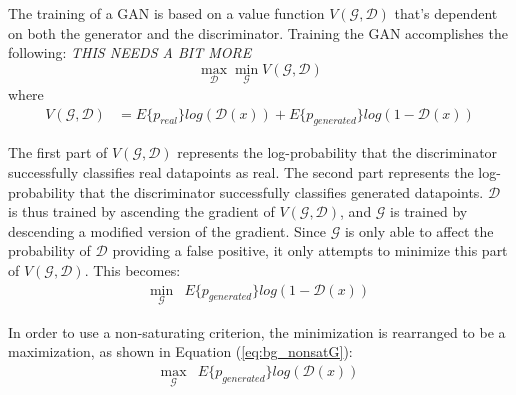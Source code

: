 	\par The training of a GAN is based on a value function $V(\mathcal{G},\mathcal{D})$ that's dependent on both the generator and the discriminator. Training the GAN accomplishes the following: \textit{THIS NEEDS A BIT MORE}
	\[ \max_\mathcal{D}\min_\mathcal{G} V(\mathcal{G},\mathcal{D}) \] where
	\begin{align}
		V(\mathcal{G},\mathcal{D}) &= E\{p_{real}\}log(\mathcal{D}(x)) + E\{p_{generated}\} log(1-\mathcal{D}(x))
	\end{align}
	\par The first part of $V(\mathcal{G},\mathcal{D})$ represents the log-probability that the discriminator successfully classifies real datapoints as real. The second part represents the log-probability that the discriminator successfully classifies generated datapoints. $\mathcal{D}$ is thus trained by ascending the gradient of $V(\mathcal{G},\mathcal{D})$, and $\mathcal{G}$ is trained by descending a modified version of the gradient. Since $\mathcal{G}$ is only able to affect the probability of $\mathcal{D}$ providing a false positive, it only attempts to minimize this part of $V(\mathcal{G},\mathcal{D})$. This becomes:
	\begin{align}
		\min_\mathcal{G}& E\{p_{generated}\} log(1-\mathcal{D}(x))
	\end{align}
	\par In order to use a non-saturating criterion, the minimization is rearranged to be a maximization, as shown in Equation (\ref{eq:bg_nonsatG}):
	\begin{align}
		\max_\mathcal{G}&E\{p_{generated}\} log(\mathcal{D}(x)) \label{eq:bg_nonsatG} 
	\end{align}
	
